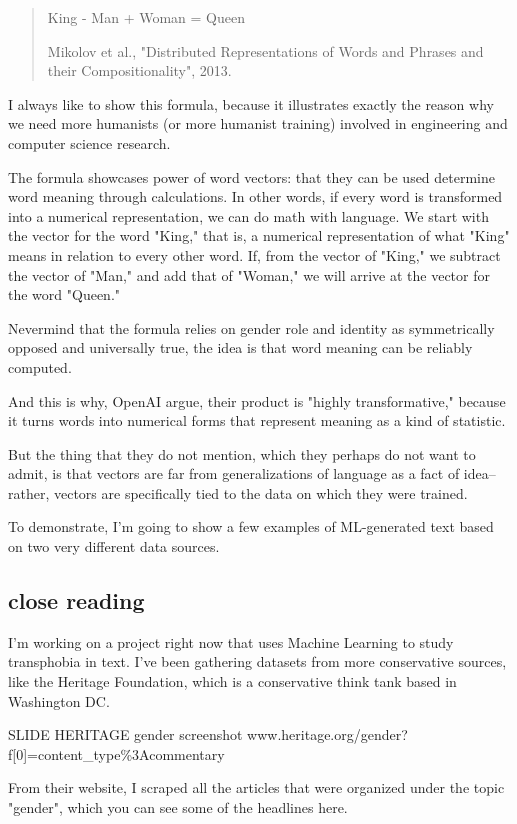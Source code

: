 \documentclass[11pt]{article}
\begin{document}
\begin{quote}
King - Man + Woman = Queen

Mikolov et al., "Distributed Representations of Words and Phrases and
their Compositionality", 2013.
\end{quote}

I always like to show this formula, because it illustrates exactly the
reason why we need more humanists (or more humanist training) involved
in engineering and computer science research.

The formula showcases power of word vectors: that they can be used
determine word meaning through calculations. In other words, if every
word is transformed into a numerical representation, we can do math
with language. We start with the vector for the word "King," that is,
a numerical representation of what "King" means in relation to every
other word. If, from the vector of "King," we subtract the vector of
"Man," and add that of "Woman," we will arrive at the vector for the
word "Queen."

Nevermind that the formula relies on gender role and identity as
symmetrically opposed and universally true, the idea is that word
meaning can be reliably computed.

And this is why, OpenAI argue, their product is "highly
transformative," because it turns words into numerical forms that
represent meaning as a kind of statistic.

But the thing that they do not mention, which they perhaps do not want to
admit, is that vectors are far from generalizations of language as a
fact of idea-- rather, vectors are specifically tied to the data on
which they were trained.

To demonstrate, I'm going to show a few examples of ML-generated text
based on two very different data sources.

\subsection{close reading}
\label{sec:org650b526}
I'm working on a project right now that uses Machine Learning to
study transphobia in text. I've been gathering datasets from
more conservative sources, like the Heritage Foundation, which is a
conservative think tank based in Washington DC.

SLIDE HERITAGE gender screenshot
www.heritage.org/gender?f[0]=content\_type\%3Acommentary   

From their website, I scraped all the articles that were organized
under the topic "gender", which you can see some of the headlines
here. 
\end{document}
